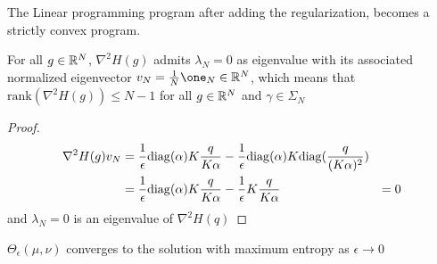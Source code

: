 \begin{theorem}
	The Linear programming program after adding the regularization, becomes a strictly convex program.
\end{theorem}
\begin{lemma}
	For all $g\in \mathbb{R}^N$, $\nabla^2 H(g)$ admits $\lambda_N=0$ as eigenvalue with its associated normalized eigenvector $v_N= \frac{1}{N}\one_N\in \Real^N$, which means that $\mathrm{rank}(\nabla^2 H(g))\leq N-1$ for all $g\in \mathbb{R}^N$ and $\gamma\in \Sigma_N$
\end{lemma}
\begin{proof}
\begin{align*}
	\nabla^2 H(g) v_N &=\frac{1}{\epsilon}\mathrm{diag}(\alpha)K\frac{q}{K\alpha}-\frac{1}{\epsilon}\mathrm{diag}(\alpha)K\mathrm{diag}(\frac{q}{(K\alpha)^2})\\
	&=\frac{1}{\epsilon}\mathrm{diag}(\alpha)K\frac{q}{K\alpha}-\frac{1}{\epsilon}K\frac{q}{K\alpha}
	&=0
\end{align*}
and $\lambda_N=0$ is an eigenvalue of $\nabla^2H(q)$
\end{proof}
\begin{theorem}
	$\Theta_\epsilon(\mu, \nu)$ converges to the solution with maximum entropy as $\epsilon\rightarrow 0$
\end{theorem}

